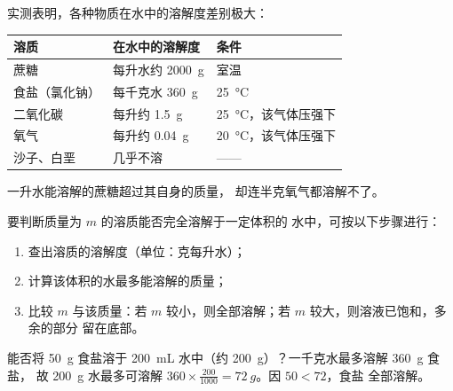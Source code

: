 \begin{proposition}[一些物质在水中的溶解度]\label{prop:g6:solutions-and-solubility:values}
实测表明，各种物质在水中的溶解度差别极大：
\begin{center}
\small
\begin{tabular}{lll}
\hline
溶质 & 在水中的溶解度 & 条件 \\
\hline
蔗糖 & 每升水约 \qty{2000}{g} & 室温 \\
食盐（氯化钠） & 每千克水 \qty{360}{g} & \qty{25}{\celsius} \\
二氧化碳 & 每升约 \qty{1.5}{g} & \qty{25}{\celsius}，该气体压强下 \\
氧气 & 每升约 \qty{0.04}{g} & \qty{20}{\celsius}，该气体压强下 \\
沙子、白垩 & 几乎不溶 &——\\
\hline
\end{tabular}
\end{center}
一升水能溶解的蔗糖超过其自身的质量，
却连半克氧气都溶解不了。
\end{proposition}

\begin{method}[能否全部溶解？]\label{met:g6:solutions-and-solubility:will-it}
要判断质量为 $m$ 的溶质能否完全溶解于一定体积的
水中，可按以下步骤进行：
\begin{enumerate}
  \item 查出溶质的溶解度（单位：克每升水）；
  \item 计算该体积的水最多能溶解的质量；
  \item 比较 $m$ 与该质量：若 $m$ 较小，则全部溶解；若 $m$
        较大，则溶液已饱和，多余的部分
        留在底部。
\end{enumerate}
\end{method}

\begin{example}[杯中的食盐]\label{ex:g6:solutions-and-solubility:glass}
能否将 \qty{50}{g} 食盐溶于 \qty{200}{mL} 水中（约
\qty{200}{g}）？一千克水最多溶解 \qty{360}{g} 食盐，
故 \qty{200}{g} 水最多可溶解 $360 \times
\frac{200}{1000} = \qty{72}{g}$。因 $50 < 72$，食盐
全部溶解。
\end{example}

